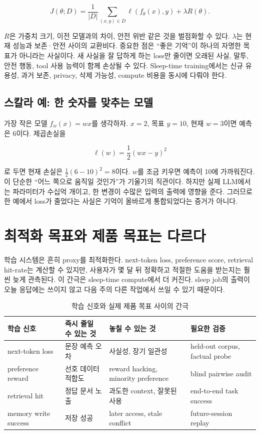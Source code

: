\begin{equation}
  J(\theta;D)=\frac{1}{|D|}\sum_{(x,y)\in D}\ell(f_\theta(x),y)
  +\lambda R(\theta).
  \label{eq:bg-objective}
\end{equation}

$R$은 가중치 크기, 이전 모델과의 차이, 안전 위반 같은 것을 벌점화할 수 있다.
$\lambda$는 현재 성능과 보존·안전 사이의 교환비다. 중요한 점은 ``좋은 기억''이 하나의
자명한 목표가 아니라는 사실이다. 새 사실을 잘 답하게 하는 loss만 줄이면 오래된 사실,
말투, 안전 행동, tool 사용 능력이 함께 손상될 수 있다. Sleep-time training에서는
신규 유용성, 과거 보존, privacy, 삭제 가능성, compute 비용을 동시에 다뤄야 한다.

\subsection{스칼라 예: 한 숫자를 맞추는 모델}

가장 작은 모델 $f_w(x)=wx$를 생각하자. $x=2$, 목표 $y=10$, 현재 $w=3$이면
예측은 $6$이다. 제곱손실을

\begin{equation}
  \ell(w)=\frac{1}{2}(wx-y)^2
  \label{eq:bg-scalar-loss}
\end{equation}

로 두면 현재 손실은 $\frac12(6-10)^2=8$이다. $w$를 조금 키우면 예측이 10에
가까워진다. 이 단순한 ``어느 쪽으로 움직일 것인가''가 기울기의 직관이다. 하지만 실제
LLM에서는 파라미터가 수십억 개이고, 한 변경이 수많은 입력의 출력에 영향을 준다.
그러므로 한 예에서 loss가 줄었다는 사실은 기억이 올바르게 통합되었다는 증거가 아니다.

\section{최적화 목표와 제품 목표는 다르다}

학습 시스템은 흔히 proxy를 최적화한다. next-token loss, preference score, retrieval
hit-rate는 계산할 수 있지만, 사용자가 몇 달 뒤 정확하고 적절한 도움을 받는지는 훨씬 늦게
관측된다. 이 간극은 sleep-time compute에서 더 커진다. sleep job의 출력이 오늘 응답에는
쓰이지 않고 다음 주의 다른 작업에서 쓰일 수 있기 때문이다.

\begin{table}[htbp]
\centering
\caption{학습 신호와 실제 제품 목표 사이의 간극}
\label{tab:bg-proxy-gap}
\begin{tabularx}{\textwidth}{L{0.20\textwidth}YYL{0.22\textwidth}}
\toprule
학습 신호 & 즉시 줄일 수 있는 것 & 놓칠 수 있는 것 & 필요한 검증 \\
\midrule
next-token loss & 문장 예측 오차 & 사실성, 장기 일관성 & held-out corpus, factual probe \\
preference reward & 선호 데이터 적합도 & reward hacking, minority preference & blind pairwise audit \\
retrieval hit & 정답 문서 노출 & 과도한 context, 잘못된 사용 & end-to-end task success \\
memory write success & 저장 성공 & later access, stale conflict & future-session replay \\
\bottomrule
\end{tabularx}
\end{table}

